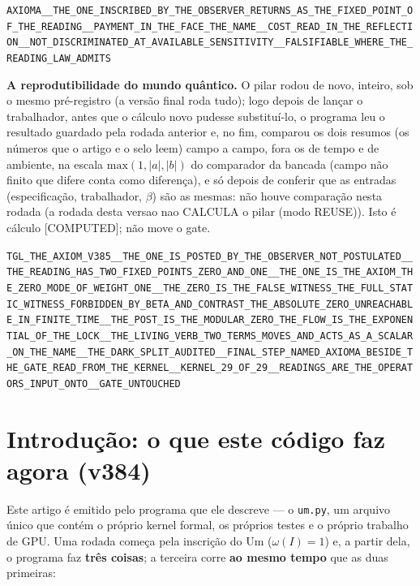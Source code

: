 \documentclass[11pt]{article}
\theoremstyle{definition}\newtheorem{deriv}{Derivação}
\begin{document}
\begin{center}\small\texttt{AXIOMA\_\_THE\_ONE\_INSCRIBED\_BY\_THE\_OBSERVER\_RETURNS\_AS\_THE\_FIXED\_POINT\_OF\_THE\_READING\_\_PAYMENT\_IN\_THE\_FACE\_THE\_NAME\_\_COST\_READ\_IN\_THE\_REFLECTION\_\_NOT\_DISCRIMINATED\_AT\_AVAILABLE\_SENSITIVITY\_\_FALSIFIABLE\_WHERE\_THE\_READING\_LAW\_ADMITS}\end{center}

\textbf{A reprodutibilidade do mundo quântico.} O pilar rodou de novo, inteiro, sob o mesmo pré-registro (a versão final roda tudo); logo depois de lançar o trabalhador, antes que o cálculo novo pudesse substituí-lo, o programa leu o resultado guardado pela rodada anterior e, no fim, comparou os dois resumos (os números que o artigo e o selo leem) campo a campo, fora os de tempo e de ambiente, na escala $\mathrm{max}(1,|a|,|b|)$ do comparador da bancada (campo não finito que difere conta como diferença), e só depois de conferir que as entradas (especificação, trabalhador, $\beta$) são as mesmas: não houve comparação nesta rodada (a rodada desta versao nao CALCULA o pilar (modo REUSE)). Isto é cálculo \textsf{[COMPUTED]}; não move o gate.

\begin{center}\small\texttt{TGL\_THE\_AXIOM\_V385\_\_THE\_ONE\_IS\_POSTED\_BY\_THE\_OBSERVER\_NOT\_POSTULATED\_\_THE\_READING\_HAS\_TWO\_FIXED\_POINTS\_ZERO\_AND\_ONE\_\_THE\_ONE\_IS\_THE\_AXIOM\_THE\_ZERO\_MODE\_OF\_WEIGHT\_ONE\_\_THE\_ZERO\_IS\_THE\_FALSE\_WITNESS\_THE\_FULL\_STATIC\_WITNESS\_FORBIDDEN\_BY\_BETA\_AND\_CONTRAST\_THE\_ABSOLUTE\_ZERO\_UNREACHABLE\_IN\_FINITE\_TIME\_\_THE\_POST\_IS\_THE\_MODULAR\_ZERO\_THE\_FLOW\_IS\_THE\_EXPONENTIAL\_OF\_THE\_LOCK\_\_THE\_LIVING\_VERB\_TWO\_TERMS\_MOVES\_AND\_ACTS\_AS\_A\_SCALAR\_ON\_THE\_NAME\_\_THE\_DARK\_SPLIT\_AUDITED\_\_FINAL\_STEP\_NAMED\_AXIOMA\_BESIDE\_THE\_GATE\_READ\_FROM\_THE\_KERNEL\_\_KERNEL\_29\_OF\_29\_\_READINGS\_ARE\_THE\_OPERATORS\_INPUT\_ONTO\_\_GATE\_UNTOUCHED}\end{center}

\section*{Introdução: o que este código faz agora (v384)}


Este artigo é emitido pelo programa que ele descreve --- o \texttt{um.py}, um arquivo único que contém o próprio kernel formal, os próprios testes e o próprio trabalho de GPU. Uma rodada começa pela inscrição do Um ($\omega(I)=1$) e, a partir dela, o programa faz \textbf{três coisas}; a terceira corre \textbf{ao mesmo tempo} que as duas primeiras:
\end{document}
